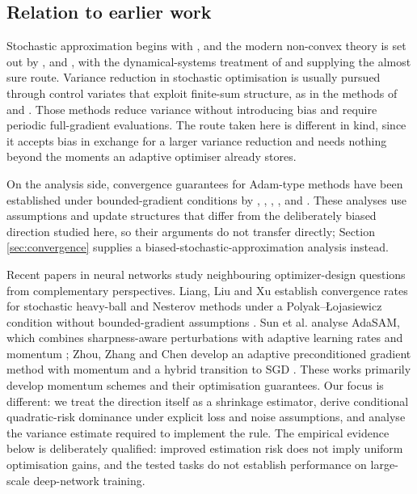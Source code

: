 \documentclass[a4paper,fleqn]{cas-sc}
\theoremstyle{plain}
\theoremstyle{definition}
\theoremstyle{remark}
\begin{document}
\subsection{Relation to earlier work}

Stochastic approximation begins with \citet{robbins1951}, and the modern non-convex theory is set out by \citet{nemirovski2009}, \citet{ghadimi2013} and \citet{bottou2018}, with the dynamical-systems treatment of \citet{borkar2008} and \citet{kushner2003} supplying the almost sure route. Variance reduction in stochastic optimisation is usually pursued through control variates that exploit finite-sum structure, as in the methods of \citet{johnson2013} and \citet{defazio2014}. Those methods reduce variance without introducing bias and require periodic full-gradient evaluations. The route taken here is different in kind, since it accepts bias in exchange for a larger variance reduction and needs nothing beyond the moments an adaptive optimiser already stores.

On the analysis side, convergence guarantees for Adam-type methods have been established under bounded-gradient conditions by \citet{reddi2018}, \citet*{chen2019}, \citet{zaheer2018}, \citet{barakat2021}, and \citet{defossez2022}. These analyses use assumptions and update structures that differ from the deliberately biased direction studied here, so their arguments do not transfer directly; Section \ref{sec:convergence} supplies a biased-stochastic-approximation analysis instead.

Recent papers in neural networks study neighbouring optimizer-design questions from complementary perspectives. Liang, Liu and Xu establish convergence rates for stochastic heavy-ball and Nesterov methods under a Polyak--Łojasiewicz condition without bounded-gradient assumptions \citep{liang2023momentum}. Sun et al. analyse AdaSAM, which combines sharpness-aware perturbations with adaptive learning rates and momentum \citep{sun2024adasam}; Zhou, Zhang and Chen develop an adaptive preconditioned gradient method with momentum and a hybrid transition to SGD \citep{zhou2026adapgradm}. These works primarily develop momentum schemes and their optimisation guarantees. Our focus is different: we treat the direction itself as a shrinkage estimator, derive conditional quadratic-risk dominance under explicit loss and noise assumptions, and analyse the variance estimate required to implement the rule. The empirical evidence below is deliberately qualified: improved estimation risk does not imply uniform optimisation gains, and the tested tasks do not establish performance on large-scale deep-network training.
\end{document}
